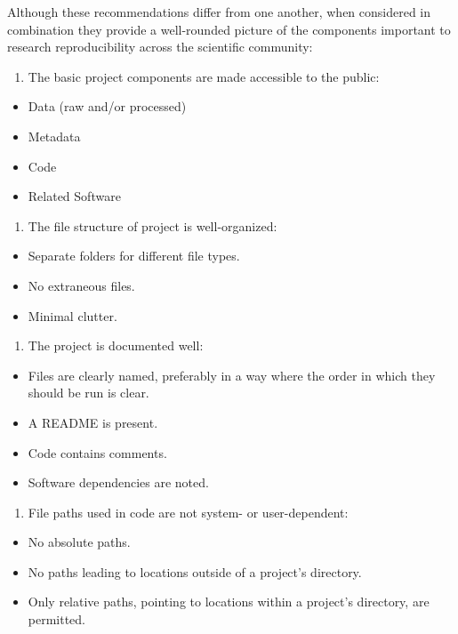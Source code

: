 \documentclass[12pt,twoside]{reedthesis}
\providecommand{\tightlist}{%
  \setlength{\itemsep}{0pt}\setlength{\parskip}{0pt}}
\begin{document}
Although these recommendations differ from one another, when considered
in combination they provide a well-rounded picture of the components
important to research reproducibility across the scientific community:
\begin{enumerate}
\def\labelenumi{\arabic{enumi}.}
\tightlist
\item
  The basic project components are made accessible to the public:
\end{enumerate}
\begin{itemize}
\tightlist
\item
  Data (raw and/or processed)
\item
  Metadata
\item
  Code
\item
  Related Software
\end{itemize}
\begin{enumerate}
\def\labelenumi{\arabic{enumi}.}
\setcounter{enumi}{1}
\tightlist
\item
  The file structure of project is well-organized:
\end{enumerate}
\begin{itemize}
\tightlist
\item
  Separate folders for different file types.
\item
  No extraneous files.
\item
  Minimal clutter.
\end{itemize}
\begin{enumerate}
\def\labelenumi{\arabic{enumi}.}
\setcounter{enumi}{2}
\tightlist
\item
  The project is documented well:
\end{enumerate}
\begin{itemize}
\tightlist
\item
  Files are clearly named, preferably in a way where the order in which
  they should be run is clear.
\item
  A README is present.
\item
  Code contains comments.
\item
  Software dependencies are noted.
\end{itemize}
\begin{enumerate}
\def\labelenumi{\arabic{enumi}.}
\setcounter{enumi}{3}
\tightlist
\item
  File paths used in code are not system- or user-dependent:
\end{enumerate}
\begin{itemize}
\tightlist
\item
  No absolute paths.
\item
  No paths leading to locations outside of a project's directory.
\item
  Only relative paths, pointing to locations within a project's
  directory, are permitted.
\end{itemize}
\end{document}
